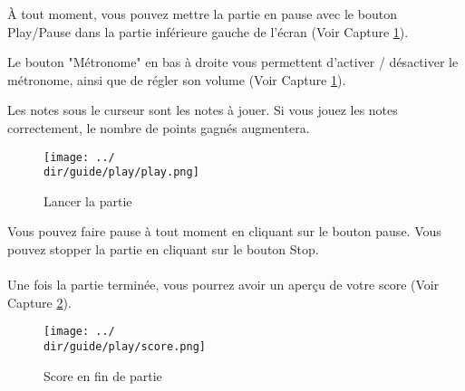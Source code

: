 À tout moment, vous pouvez mettre la partie en pause avec le bouton Play/Pause dans la partie inférieure gauche de l'écran (Voir Capture \ref{fig:play}).

Le bouton "Métronome" en bas à droite vous permettent d'activer / désactiver le métronome, ainsi que de régler son volume (Voir Capture \ref{fig:play}).

Les notes sous le curseur sont les notes à jouer. Si vous jouez les notes correctement, le nombre de points gagnés augmentera.

\begin{figure}[H]
	\texttt{[image: ../\\dir/guide/play/play.png]}
	\caption{Lancer la partie}
	\label{fig:play}
\end{figure}

Vous pouvez faire pause à tout moment en cliquant sur le bouton pause. Vous pouvez stopper la partie en cliquant sur le bouton Stop.
\\\\
Une fois la partie terminée, vous pourrez avoir un aperçu de votre score (Voir Capture \ref{fig:score}).

\begin{figure}[H]
	\texttt{[image: ../\\dir/guide/play/score.png]}
	\caption{Score en fin de partie}
	\label{fig:score}
\end{figure}